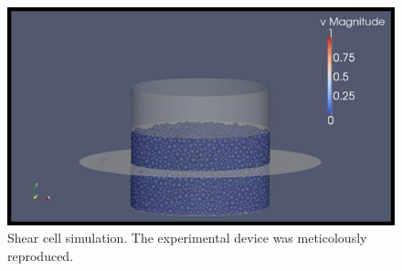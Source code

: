 \begin{figure}[!htb]
\centering
\includegraphics[width=.80\columnwidth]{images/007shearcellsim}
\caption[Shear cell simulation]{Shear cell simulation. The experimental device
was meticolously reproduced.}
\label{fig:007shearcellsim}
\end{figure}